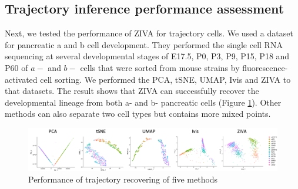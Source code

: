 \subsection{Trajectory inference performance assessment}
Next, we tested the performance of ZIVA for trajectory cells. We used a dataset for pancreatic a and b cell development. They performed the single cell RNA sequencing at several developmental stages of E17.5, P0, P3, P9, P15, P18 and P60 of $a-$ and $b-$ cells that were sorted from mouse strains by fluorescence-activated cell sorting. We performed the PCA, tSNE, UMAP, Ivis and ZIVA to that datasets. The result shows that ZIVA can successfully recover the developmental lineage from both a- and b- pancreatic cells (Figure \ref{traj}). Other methods can also separate two cell types but contains more mixed points.  
\begin{figure}[htb!]
    \centering
    \includegraphics[width=1\textwidth]{figures/myfigures/traj.png}
    \caption{Performance of trajectory recovering of five methods}
    \label{traj}
\end{figure}

